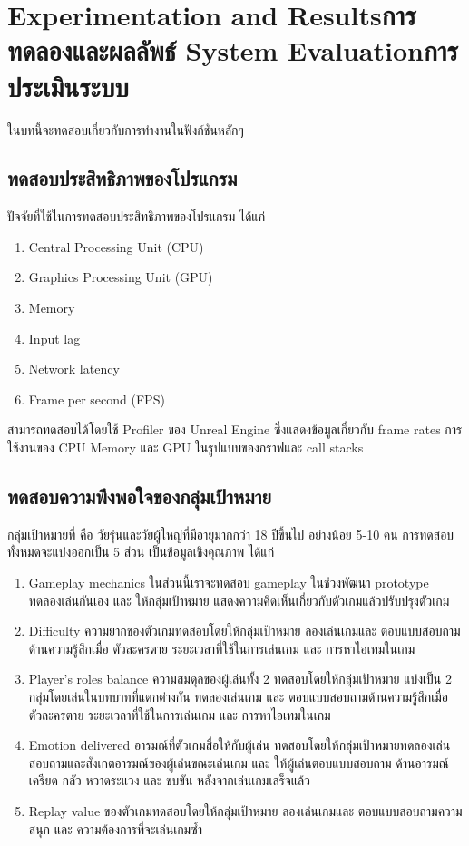 \chapter{\ifproject%
\ifenglish Experimentation and Results\else การทดลองและผลลัพธ์\fi
\else%
\ifenglish System Evaluation\else การประเมินระบบ\fi
\fi}

ในบทนี้จะทดสอบเกี่ยวกับการทำงานในฟังก์ชันหลักๆ

\section{ทดสอบประสิทธิภาพของโปรแกรม}

ปัจจัยที่ใช้ในการทดสอบประสิทธิภาพของโปรแกรม ได้แก่
\begin{enumerate}
    \item Central Processing Unit (CPU)
    \item Graphics Processing Unit (GPU)
    \item Memory
    \item Input lag
    \item Network latency
    \item Frame per second (FPS)
\end{enumerate}

สามารถทดสอบได้โดยใช้ Profiler ของ Unreal Engine ซึ่งแสดงข้อมูลเกี่ยวกับ frame rates การใช้งานของ CPU Memory และ GPU ในรูปแบบของกราฟและ call stacks

\section{ทดสอบความพึงพอใจของกลุ่มเป้าหมาย}

กลุ่มเป้าหมายที่ คือ วัยรุ่นและวัยผู้ใหญ่ที่มีอายุมากกว่า 18 ปีขึ้นไป อย่างน้อย 5-10 คน การทดสอบทั้งหมดจะแบ่งออกเป็น 5 ส่วน เป็นข้อมูลเชิงคุณภาพ ได้แก่
\begin{enumerate}
    \item Gameplay mechanics ในส่วนนี้เราจะทดสอบ gameplay ในช่วงพัฒนา prototype ทดลองเล่นกันเอง และ ให้กลุ่มเป้าหมาย แสดงความคิดเห็นเกี่ยวกับตัวเกมแล้วปรับปรุงตัวเกม
    \item Difficulty ความยากของตัวเกมทดสอบโดยให้กลุ่มเป้าหมาย ลองเล่นเกมและ ตอบแบบสอบถามด้านความรู้สึกเมื่อ ตัวละครตาย ระยะเวลาที่ใช้ในการเล่นเกม และ การหาไอเทมในเกม
    \item Player's roles balance ความสมดุลของผู้เล่นทั้ง 2 ทดสอบโดยให้กลุ่มเป้าหมาย แบ่งเป็น 2 กลุ่มโดยเล่นในบทบาทที่แตกต่างกัน  ทดลองเล่นเกม และ ตอบแบบสอบถามด้านความรู้สึกเมื่อ ตัวละครตาย ระยะเวลาที่ใช้ในการเล่นเกม และ การหาไอเทมในเกม
    \item Emotion delivered อารมณ์ที่ตัวเกมสื่อให้กับผู้เล่น ทดสอบโดยให้กลุ่มเป้าหมายทดลองเล่น สอบถามและสังเกตอารมณ์ของผู้เล่นขณะเล่นเกม และ ให้ผู้เล่นตอบแบบสอบถาม ด้านอารมณ์ เครียด กลัว หวาดระแวง และ ขบขัน หลังจากเล่นเกมเสร็จแล้ว
    \item Replay value ของตัวเกมทดสอบโดยให้กลุ่มเป้าหมาย ลองเล่นเกมและ ตอบแบบสอบถามความสนุก และ ความต้องการที่จะเล่นเกมซ้ำ
\end{enumerate}